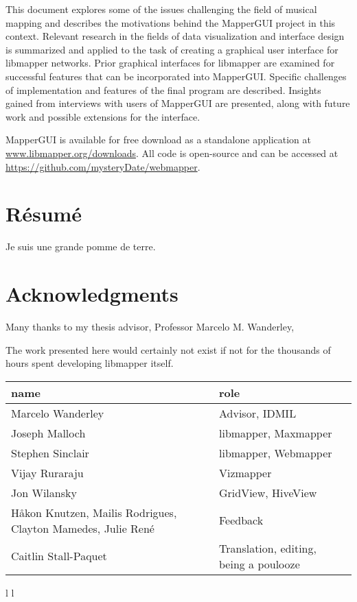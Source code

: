 \documentclass [12pt,letterpaper]{report}
\begin{document}
This document explores some of the issues challenging the field of musical mapping and describes the motivations behind the MapperGUI project in this context. Relevant research in the fields of data visualization and interface design is summarized and applied to the task of creating a graphical user interface for libmapper networks. Prior graphical interfaces for libmapper are examined for successful features that can be incorporated into MapperGUI. Specific challenges of implementation and features of the final program are described. Insights gained from interviews with users of MapperGUI are presented, along with future work and possible extensions for the interface.

MapperGUI is available for free download as a standalone application at \url{www.libmapper.org/downloads}. All code is open-source and can be accessed at \url{https://github.com/mysteryDate/webmapper}.

\newpage

\section*{\centering R\'esum\'e}

Je suis une grande pomme de terre.

\pagebreak

\section*{\centering Acknowledgments}

Many thanks to my thesis advisor, Professor Marcelo M. Wanderley, 

The work presented here would certainly not exist if not for the thousands of hours spent developing libmapper itself. 

\begin{table}
    \centering
    \begin{tabular}{p{7cm} l}
        \hline\hline
        name&role\\
        \hline
        Marcelo Wanderley& Advisor, IDMIL\\
        Joseph Malloch& libmapper, Maxmapper\\
        Stephen Sinclair& libmapper, Webmapper\\
        Vijay Ruraraju& Vizmapper\\
        Jon Wilansky& GridView, HiveView\\
        H\aa kon Knutzen, Mailis Rodrigues, Clayton Mamedes, Julie Ren\'e&Feedback\\
        Caitlin Stall-Paquet&Translation, editing, being a poulooze\\
    \end{tabular}{l l}
\end{table}
\end{document}
